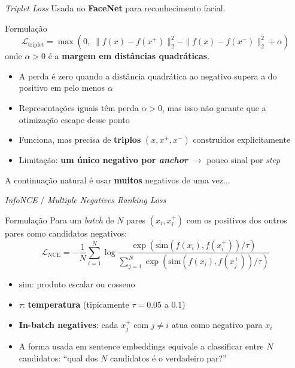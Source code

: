 \documentclass[aspectratio=169, xcolor=dvipsnames]{beamer}
\begin{document}
  \begin{frame}{\textit{Triplet Loss}}
    Usada no \textbf{FaceNet}  para reconhecimento facial.
    \vspace{0.3em}
    \begin{block}{Formulação}
      \[
        \mathcal{L}_{\text{triplet}} = \max\!\left( 0,\; \| f(x) - f(x^+) \|_2^2 - \| f(x) - f(x^-) \|_2^2 + \alpha \right)
      \]
      onde $\alpha > 0$ é a \textbf{margem em distâncias quadráticas}.
    \end{block}
    \vspace{0.3em}
    \begin{itemize}
      \item A perda é zero quando a distância quadrática ao negativo supera a do positivo em pelo menos $\alpha$
      \item Representações iguais têm perda $\alpha>0$, mas isso não garante que a otimização escape desse ponto
      \item Funciona, mas precisa de \textbf{triplos} $(x, x^+, x^-)$ construídos explicitamente
      \item Limitação: \textbf{um único negativo por \textit{anchor}} $\to$ pouco sinal por \textit{step}
    \end{itemize}
    \vspace{0.3em}
    A continuação natural é usar \textbf{muitos} negativos de uma vez...
  \end{frame}

  \begin{frame}{\textit{InfoNCE} / \textit{Multiple Negatives Ranking Loss}}
    
    \begin{block}{Formulação}
      Para um \textit{batch} de $N$ pares $(x_i, x_i^+)$ com os positivos dos outros pares como candidatos negativos:
      \[
        \mathcal{L}_{\text{NCE}} = -\frac{1}{N} \sum_{i=1}^{N} \log \frac{\exp(\text{sim}(f(x_i), f(x_i^+)) / \tau)}{\sum_{j=1}^{N} \exp(\text{sim}(f(x_i), f(x_j^+)) / \tau)}
      \]
    \end{block}
    \vspace{0.3em}
    \begin{itemize}
      \item $\text{sim}$: produto escalar ou cosseno
      \item $\tau$: \textbf{temperatura} (tipicamente $\tau = 0.05$ a $0.1$)
      \item \textbf{In-batch negatives}: cada $x_j^+$ com $j \neq i$ atua como negativo para $x_i$
      \item A forma usada em sentence embeddings\cite{henderson2017mnrl} equivale a classificar entre $N$ candidatos: ``qual dos $N$ candidatos é o verdadeiro par?''
    \end{itemize}
  \end{frame}
\end{document}
